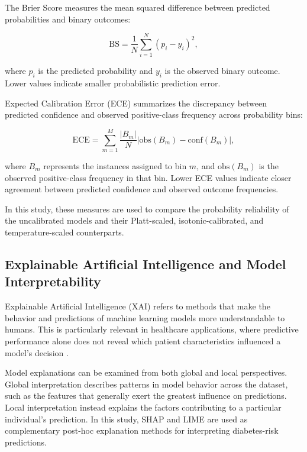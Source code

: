 The Brier Score measures the mean squared difference between predicted
probabilities and binary outcomes:

\begin{equation}
\mathrm{BS} =
\frac{1}{N}\sum_{i=1}^{N}(p_i-y_i)^2,
\end{equation}

where $p_i$ is the predicted probability and $y_i$ is the observed binary
outcome. Lower values indicate smaller probabilistic prediction error.

Expected Calibration Error (ECE) summarizes the discrepancy between
predicted confidence and observed positive-class frequency across
probability bins:

\begin{equation}
\mathrm{ECE} =
\sum_{m=1}^{M}
\frac{|B_m|}{N}
\left|
\mathrm{obs}(B_m)-\mathrm{conf}(B_m)
\right|,
\end{equation}

where $B_m$ represents the instances assigned to bin $m$, and
$\mathrm{obs}(B_m)$ is the observed positive-class frequency in that bin.
Lower ECE values indicate closer agreement between predicted confidence and
observed outcome frequencies.

In this study, these measures are used to compare the probability
reliability of the uncalibrated models and their Platt-scaled,
isotonic-calibrated, and temperature-scaled counterparts.

\subsection{Explainable Artificial Intelligence and Model Interpretability}

Explainable Artificial Intelligence (XAI) refers to methods that make the
behavior and predictions of machine learning models more understandable to
humans. This is particularly relevant in healthcare applications, where
predictive performance alone does not reveal which patient characteristics
influenced a model's decision \cite{xai_healthcare_review_2022}.

Model explanations can be examined from both global and local perspectives.
Global interpretation describes patterns in model behavior across the
dataset, such as the features that generally exert the greatest influence
on predictions. Local interpretation instead explains the factors
contributing to a particular individual's prediction. In this study, SHAP
and LIME are used as complementary post-hoc explanation methods for
interpreting diabetes-risk predictions.

